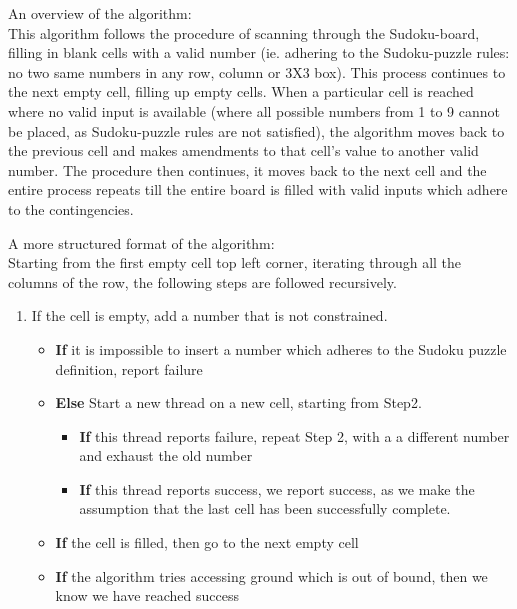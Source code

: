 \documentclass[12pt]{article}
\begin{document}
\begin{flushleft}
An overview of the algorithm:\\
This algorithm follows the procedure of scanning through the Sudoku-board, filling in blank cells with a valid number (ie. adhering to the Sudoku-puzzle rules: no two same numbers in any row, column or 3X3 box). This process continues to the next empty cell, filling up empty cells. When a particular cell is reached where no valid input is available (where all possible numbers from 1 to 9 cannot be placed, as Sudoku-puzzle rules are not satisfied), the algorithm moves back to the previous cell and makes amendments to that cell's value to another valid number. The procedure then continues, it moves back to the next cell and the entire process repeats till the entire board is filled with valid inputs which adhere to the contingencies. 
\end{flushleft}

\begin{flushleft}
A more structured format of the algorithm: \\
Starting from the first empty cell top left corner, iterating through all the columns of the row, the following steps are followed recursively. \\
\begin{enumerate}
\item If the cell is empty, add a number that is not constrained.
\begin{itemize}
\item \textbf{If} it is impossible to insert a number which adheres to the Sudoku puzzle definition, report failure 
\item \textbf{Else} Start a new thread on a new cell, starting from Step2.
\begin{itemize}
\item \textbf{If} this thread reports failure, repeat Step 2, with a a different number and exhaust the old number
\item \textbf{If} this thread reports success, we report success, as we make the assumption that the last cell has been successfully complete.  
\end{itemize}
\item \textbf{If} the cell is filled, then go to the next empty cell
\item \textbf{If} the algorithm tries accessing ground which is out of bound, then we know we have reached success
\end{itemize}
\end{enumerate}
\end{flushleft}
\end{document}
